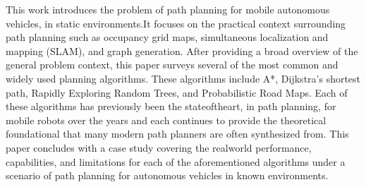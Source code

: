 This work introduces the problem of path planning for mobile autonomous vehicles, in static environments.It focuses on the practical context surrounding path planning such as occupancy grid maps, simultaneous localization and mapping (SLAM), and graph generation. After providing a broad overview of the general problem context, this paper surveys several of the most common and widely used planning algorithms. These algorithms include A*, Dijkstra's shortest path, Rapidly Exploring Random Trees, and Probabilistic Road Maps. Each of these algorithms has previously been the stateoftheart, in path planning, for mobile robots over the years and each continues to provide the theoretical foundational that many modern path planners are often synthesized from. This paper concludes with a case study covering the realworld performance, capabilities, and limitations for each of the aforementioned algorithms under a scenario of path planning for autonomous vehicles in known environments.